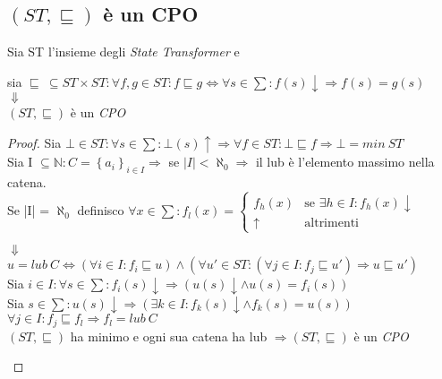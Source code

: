 \documentclass[a4paper, 10pt]{article} %
\begin{document}
\subsection{$(ST, \sqsubseteq)$ è un CPO}
\begin{esercizio}
  Sia ST l'insieme degli \emph{State Transformer} e
  \begin{center}
    sia $\sqsubseteq\ \subseteq ST \times ST :
    \forall f,g \in ST : f \sqsubseteq g \Longleftrightarrow \forall s \in \sum :
    f(s)\downarrow \Rightarrow f(s) = g(s)$\\
    $\Downarrow$\\
    $(ST, \sqsubseteq)$ è un \emph{CPO}
  \end{center}
  \begin{proof}
    Sia $\bot \in ST : \forall s \in \sum : \bot(s)\uparrow \Rightarrow \forall f \in ST : \bot \sqsubseteq f \Rightarrow \bot = min\ ST $\\
    Sia I $\subseteq \mathbb{N} : C = \left\{a_i\right\}_{i \in I} \Rightarrow$ se $|I| < \aleph_0 \Rightarrow$ il lub è l'elemento massimo nella catena.\\
    Se |I| = $\aleph_0$ definisco $\forall x \in \sum : f_l(x) = 
    \begin{cases} 
      f_h(x) & \text{se } \exists h \in I : f_h(x)\downarrow
      \\ 
      \uparrow & \text{altrimenti} 
    \end{cases} $
    \begin{center}
      $\Downarrow$\\
      $u = lub\ C \Longleftrightarrow (\forall i \in I : f_i \sqsubseteq u) \land (\forall u' \in ST : (\forall j \in I : f_j \sqsubseteq u') \Rightarrow u \sqsubseteq u')$\\
      Sia $i \in I : \forall s \in \sum : f_i(s)\downarrow \Rightarrow (u(s)\downarrow \land u(s)=f_i(s))$\\
      Sia $s \in \sum : u(s)\downarrow \Rightarrow (\exists k \in I : f_k(s)\downarrow \land f_k(s)=u(s))$\\
      $\forall j \in I : f_j \sqsubseteq f_l \Rightarrow f_l = lub\ C$\\
      $(ST, \sqsubseteq)$ ha minimo e ogni sua catena ha lub $\Rightarrow (ST, \sqsubseteq)$ è un \emph{CPO}
    \end{center}
  \end{proof}
\end{esercizio}
\end{document}

